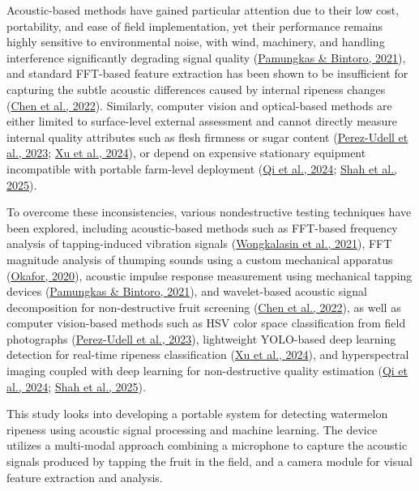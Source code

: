 \begin{thesisprose}
Acoustic-based methods have gained particular attention due to their low cost, portability, and ease of field implementation, yet their performance remains highly sensitive to environmental noise, with wind, machinery, and handling interference significantly degrading signal quality (\hyperlink{cite.pamungkas2021}{Pamungkas \& Bintoro, 2021}), and standard FFT-based feature extraction has been shown to be insufficient for capturing the subtle acoustic differences caused by internal ripeness changes (\hyperlink{cite.chen2022}{Chen et al., 2022}). Similarly, computer vision and optical-based methods are either limited to surface-level external assessment and cannot directly measure internal quality attributes such as flesh firmness or sugar content (\hyperlink{cite.perezudell2023}{Perez-Udell et al., 2023}; \hyperlink{cite.xu2024}{Xu et al., 2024}), or depend on expensive stationary equipment incompatible with portable farm-level deployment (\hyperlink{cite.qi2024}{Qi et al., 2024}; \hyperlink{cite.shah2025}{Shah et al., 2025}).

To overcome these inconsistencies, various nondestructive testing techniques have been explored, including acoustic-based methods such as FFT-based frequency analysis of tapping-induced vibration signals (\hyperlink{cite.wongkalasin2021}{Wongkalasin et al., 2021}), FFT magnitude analysis of thumping sounds using a custom mechanical apparatus (\hyperlink{cite.okafor2020}{Okafor, 2020}), acoustic impulse response measurement using mechanical tapping devices (\hyperlink{cite.pamungkas2021}{Pamungkas \& Bintoro, 2021}), and wavelet-based acoustic signal decomposition for non-destructive fruit screening (\hyperlink{cite.chen2022}{Chen et al., 2022}), as well as computer vision-based methods such as HSV color space classification from field photographs (\hyperlink{cite.perezudell2023}{Perez-Udell et al., 2023}), lightweight YOLO-based deep learning detection for real-time ripeness classification (\hyperlink{cite.xu2024}{Xu et al., 2024}), and hyperspectral imaging coupled with deep learning for non-destructive quality estimation (\hyperlink{cite.qi2024}{Qi et al., 2024}; \hyperlink{cite.shah2025}{Shah et al., 2025}).

This study looks into developing a portable system for detecting watermelon ripeness using acoustic signal processing and machine learning. The device utilizes a multi-modal approach combining a microphone to capture the acoustic signals produced by tapping the fruit in the field, and a camera module for visual feature extraction and analysis.


\end{thesisprose}
